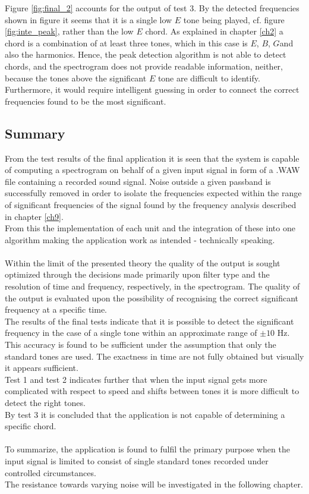 Figure \ref{fig:final_2} accounts for the output of test 3. By the detected frequencies shown in figure \label{fig:final_peak2} it seems that it is a single low $E$ tone being played, cf. figure \ref{fig:inte_peak}, rather than the low $E$ chord. As explained in chapter \ref{ch2} a chord is a combination of at least three tones, which in this case is $E$, $B$, $G$\hashsharp and also the harmonics. Hence, the peak detection algorithm is not able to detect chords, and the spectrogram does not provide readable information, neither, because the tones above the significant $E$ tone are difficult to identify. Furthermore, it would require intelligent guessing in order to connect the correct frequencies found to be the most significant.

\subsection{Summary}
From the test results of the final application it is seen that the system is capable of computing a spectrogram on behalf of a given input signal in form of a .WAW file containing a recorded sound signal. Noise outside a given passband is successfully removed in order to isolate the frequencies expected within the range of significant frequencies of the signal found by the frequency analysis described in chapter \ref{ch9}. \\
From this the implementation of each unit and the integration of these into one algorithm making the application work as intended - technically speaking. \\
\\
Within the limit of the presented theory the quality of the output is sought optimized through the decisions made primarily upon filter type and the resolution of time and frequency, respectively, in the spectrogram.
The quality of the output is evaluated upon the possibility of recognising the correct significant frequency at a specific time. \\
The results of the final tests indicate that it is possible to detect the significant frequency in the case of a single tone within an approximate range of $\pm 10$ Hz. This accuracy is found to be sufficient under the assumption that only the standard tones are used. The exactness in time are not fully obtained but visually it appears sufficient. \\        
Test 1 and test 2 indicates further that when the input signal gets more complicated with respect to speed and shifts between tones it is more difficult to detect the right tones. \\
By test 3 it is concluded that the application is not capable of determining a specific chord. \\   
\\
To summarize, the application is found to fulfil the primary purpose when the input signal is limited to consist of single standard tones recorded under controlled circumstances. \\
The resistance towards varying noise will be investigated in the following chapter.           
